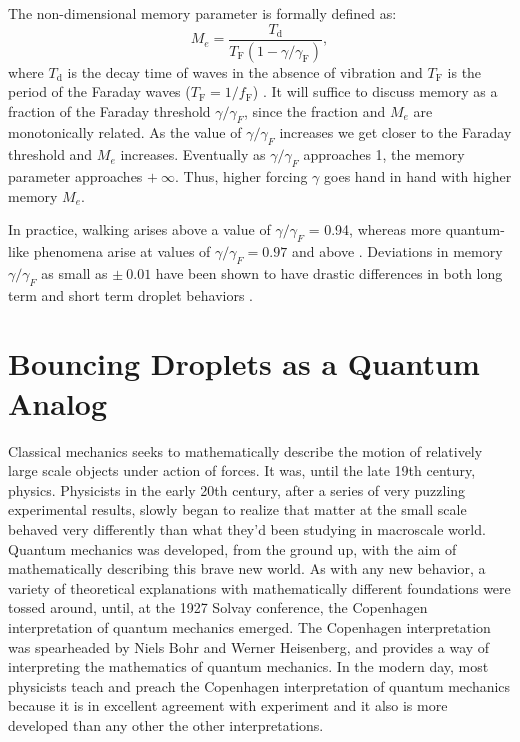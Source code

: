 The non-dimensional memory parameter is formally defined as:
$$M_e = \frac{T_\mathrm{d}}{T_\mathrm{F}(1-\gamma/\gamma_\mathrm{F})},$$
where $T_\mathrm{d}$ is the decay time of waves in the absence of vibration and $T_\mathrm{F}$ is the period of the Faraday waves ($T_\mathrm{F} = 1/f_\mathrm{F}$) . It will suffice to discuss memory as a fraction of the Faraday threshold $\gamma/\gamma_{F}$, since the fraction and $M_e$ are monotonically related. As the value of $\gamma/\gamma_{F}$ increases we get closer to the Faraday threshold and $M_e$ increases. Eventually as $\gamma/\gamma_{F}$ approaches 1, the memory parameter approaches $+~\infty$. Thus, higher forcing $\gamma$ goes hand in hand with higher memory $M_e$. 

In practice, walking arises above a value of $\gamma/\gamma_{F}$ = 0.94, whereas more quantum-like phenomena arise at values of $\gamma/\gamma_{F} = 0.97$ and above . Deviations in memory $\gamma/\gamma_{F}$ as small as $\pm~0.01$ have been shown to have drastic differences in both long term and short term droplet behaviors .
            
            
\section{Bouncing Droplets as a Quantum Analog}   

Classical mechanics seeks to mathematically describe the motion of relatively large scale objects under action of forces. It was, until the late 19th century, physics. Physicists in the early 20th century, after a series of very puzzling experimental results, slowly began to realize that matter at the small scale behaved very differently than what they'd been studying in macroscale world. Quantum mechanics was developed, from the ground up, with the aim of mathematically describing this brave new world. As with any new behavior, a variety of theoretical explanations with mathematically different foundations were tossed around, until, at the 1927 Solvay conference, the Copenhagen interpretation of quantum mechanics emerged. The Copenhagen interpretation was spearheaded by Niels Bohr and Werner Heisenberg, and provides a way of interpreting the mathematics of quantum mechanics. In the modern day, most physicists teach and preach the Copenhagen interpretation of quantum mechanics because it is in excellent agreement with experiment and it also is more developed than any other the other interpretations.

